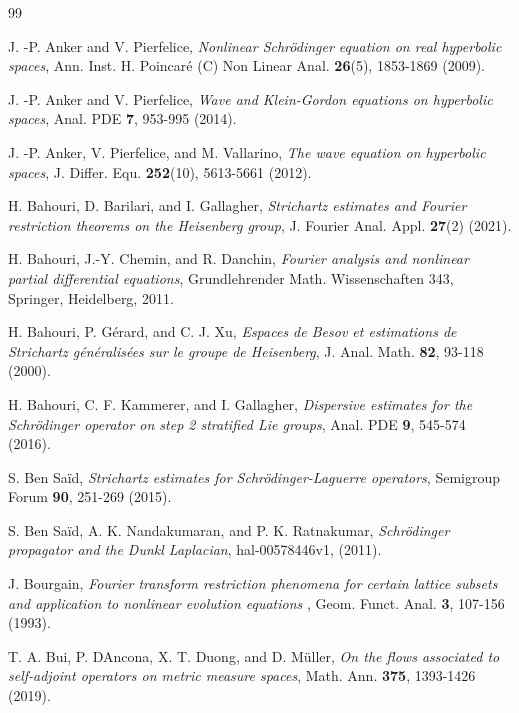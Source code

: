 \documentclass[a4paper,11pt, reqno]{amsart}
\numberwithin{equation}{section}
\theoremstyle{plain}
\theoremstyle{definition}
\theoremstyle{remark}
\begin{document}
	
	\begin{thebibliography}{99}
		
		
		\normalsize
		\baselineskip=17pt

  
\label{AP2009} J. -P. Anker and V. Pierfelice, \emph{Nonlinear Schr\"odinger equation on real hyperbolic spaces}, Ann. Inst. H.
Poincar\'e (C) Non Linear Anal. \textbf{26}(5), 1853-1869 (2009).

\label{AP2014} J. -P. Anker and V. Pierfelice, \emph{Wave and Klein-Gordon equations on hyperbolic spaces}, Anal. PDE \textbf{7}, 953-995 (2014).

\label{APV2012} J. -P. Anker, V. Pierfelice, and M. Vallarino, \emph{The wave equation on hyperbolic spaces}, J. Differ. Equ. \textbf{252}(10), 5613-5661 (2012).

\label{BBG2001} H. Bahouri, D. Barilari, and I. Gallagher, \emph{Strichartz estimates and Fourier restriction theorems on the Heisenberg group}, J. Fourier Anal. Appl. \textbf{27}(2) (2021).

 H. Bahouri, J.-Y. Chemin,  and R. Danchin, \emph{Fourier analysis and nonlinear partial differential equations},  Grundlehrender Math. Wissenschaften 343, Springer, Heidelberg, 2011.

\label{BGX2000} H. Bahouri, P. G\'{e}rard, and C. J. Xu, \emph{Espaces de Besov et estimations de Strichartz g\'{e}n\'{e}ralis\'{e}es sur le groupe de
Heisenberg}, J. Anal. Math. \textbf{82}, 93-118 (2000).

\label{BKG} H. Bahouri, C. F. Kammerer, and I. Gallagher, \emph{Dispersive estimates for the Schr\"{o}dinger operator on step 2 stratified Lie groups}, Anal. PDE \textbf{9}, 545-574 (2016).

\label{Ben said} 	 S. Ben Sa\"id, \emph{Strichartz estimates for Schr\"odinger-Laguerre operators}, {Semigroup Forum} \textbf{90}, 251-269 (2015). 
		
  S. Ben Sa\"id, A. K. Nandakumaran, and  P. K. Ratnakumar, \emph{Schr\"odinger propagator and the Dunkl Laplacian},    hal-00578446v1, (2011).


\label{B1993} J. Bourgain, \emph{Fourier transform restriction phenomena for certain lattice subsets and application to
nonlinear evolution equations \uppercase \expandafter {}}, Geom. Funct. Anal. \textbf{3}, 107-156 (1993).

\label{BDDM2019} T. A. Bui, P. DAncona, X. T. Duong, and  D. M\"{u}ller, \emph{On the flows associated to self-adjoint operators on metric measure spaces}, Math. Ann. \textbf{375}, 1393-1426 (2019).


\end{thebibliography}
\end{document}
